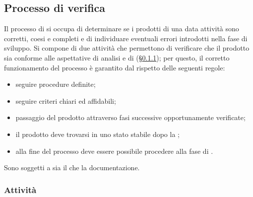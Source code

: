 {{\subsection{Processo di verifica}
Il processo di  si occupa di determinare se i prodotti di una data attività sono corretti, coesi e completi e di individuare eventuali errori introdotti nella fase di sviluppo. Si compone di due attività che permettono di verificare che il prodotto sia conforme alle aspettative di analisi e di  (\S{}\ref{veractivity}); per questo, il corretto funzionamento del processo è garantito dal rispetto delle seguenti regole: 
\begin{itemize}
	\item seguire procedure definite;
	\item seguire criteri chiari ed affidabili;
	\item passaggio del prodotto attraverso fasi successive opportunamente verificate;
	\item il prodotto deve trovarsi in uno stato stabile dopo la ;
	\item alla fine del processo deve essere possibile procedere alla fase di .
\end{itemize}
Sono soggetti a  sia il  che la documentazione. 

\subsubsection{Attività} \label{veractivity}

}}
